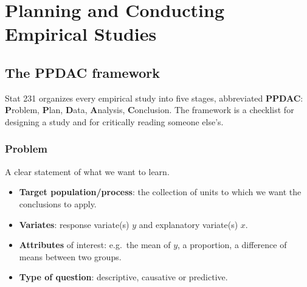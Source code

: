 \chapter{Planning and Conducting Empirical Studies}

\section{The PPDAC framework}

Stat 231 organizes every empirical study into five stages, abbreviated \textbf{PPDAC}:
\textbf{P}roblem, \textbf{P}lan, \textbf{D}ata, \textbf{A}nalysis, \textbf{C}onclusion.
The framework is a checklist for designing a study and for critically reading someone
else's.

\begin{center}
\end{center}

\subsection{Problem}
A clear statement of what we want to learn.
\begin{itemize}
  \item \textbf{Target population/process}: the collection of units to which we want
        the conclusions to apply.
  \item \textbf{Variates}: response variate(s) $y$ and explanatory variate(s) $x$.
  \item \textbf{Attributes} of interest: e.g.\ the mean of $y$, a proportion, a
        difference of means between two groups.
  \item \textbf{Type of question}: descriptive, causative or predictive.
\end{itemize}

